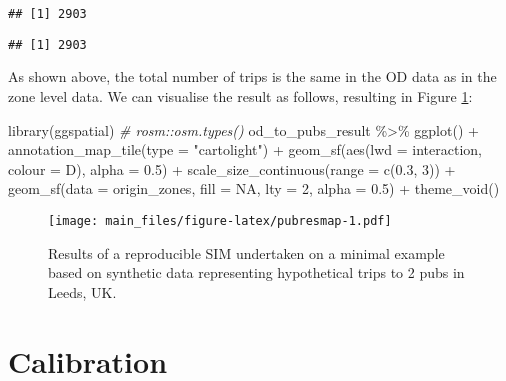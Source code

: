 \documentclass[11pt,letterpaper]{article}
\newenvironment{Shaded}{\begin{snugshade}}{\end{snugshade}}
\newcommand{\AttributeTok}[1]{\textcolor[rgb]{0.77,0.63,0.00}{#1}}
\newcommand{\CommentTok}[1]{\textcolor[rgb]{0.56,0.35,0.01}{\textit{#1}}}
\newcommand{\ConstantTok}[1]{\textcolor[rgb]{0.00,0.00,0.00}{#1}}
\newcommand{\DecValTok}[1]{\textcolor[rgb]{0.00,0.00,0.81}{#1}}
\newcommand{\FloatTok}[1]{\textcolor[rgb]{0.00,0.00,0.81}{#1}}
\newcommand{\FunctionTok}[1]{\textcolor[rgb]{0.00,0.00,0.00}{#1}}
\newcommand{\NormalTok}[1]{#1}
\newcommand{\SpecialCharTok}[1]{\textcolor[rgb]{0.00,0.00,0.00}{#1}}
\newcommand{\StringTok}[1]{\textcolor[rgb]{0.31,0.60,0.02}{#1}}
\begin{document}
\begin{verbatim}
## [1] 2903
\end{verbatim}

\begin{Shaded}
\end{Shaded}

\begin{verbatim}
## [1] 2903
\end{verbatim}

As shown above, the total number of trips is the same in the OD data as in the zone level data.
We can visualise the result as follows, resulting in Figure \ref{fig:pubresmap}:

\begin{Shaded}
\begin{Highlighting}[]
\FunctionTok{library}\NormalTok{(ggspatial)}
\CommentTok{\# rosm::osm.types()}
\NormalTok{od\_to\_pubs\_result }\SpecialCharTok{\%\textgreater{}\%} 
  \FunctionTok{ggplot}\NormalTok{() }\SpecialCharTok{+}
  \FunctionTok{annotation\_map\_tile}\NormalTok{(}\AttributeTok{type =} \StringTok{"cartolight"}\NormalTok{) }\SpecialCharTok{+}
  \FunctionTok{geom\_sf}\NormalTok{(}\FunctionTok{aes}\NormalTok{(}\AttributeTok{lwd =}\NormalTok{ interaction, }\AttributeTok{colour =}\NormalTok{ D), }\AttributeTok{alpha =} \FloatTok{0.5}\NormalTok{) }\SpecialCharTok{+}
  \FunctionTok{scale\_size\_continuous}\NormalTok{(}\AttributeTok{range =} \FunctionTok{c}\NormalTok{(}\FloatTok{0.3}\NormalTok{, }\DecValTok{3}\NormalTok{)) }\SpecialCharTok{+}
  \FunctionTok{geom\_sf}\NormalTok{(}\AttributeTok{data =}\NormalTok{ origin\_zones, }\AttributeTok{fill =} \ConstantTok{NA}\NormalTok{, }\AttributeTok{lty =} \DecValTok{2}\NormalTok{, }\AttributeTok{alpha =} \FloatTok{0.5}\NormalTok{) }\SpecialCharTok{+}
  \FunctionTok{theme\_void}\NormalTok{()}
\end{Highlighting}
\end{Shaded}

\begin{figure}
\centering
\texttt{[image: main\_files/figure-latex/pubresmap-1.pdf]}
\caption{\label{fig:pubresmap}Results of a reproducible SIM undertaken on a minimal example based on synthetic data representing hypothetical trips to 2 pubs in Leeds, UK.}
\end{figure}

\hypertarget{calibration}{%
\section{Calibration}\label{calibration}}
\end{document}
